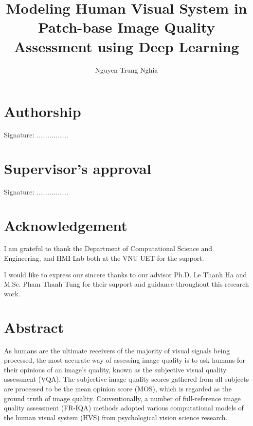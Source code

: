 \documentclass[a4paper, 13pt, oneside]{Thesis}
\title{Modeling Human Visual System in Patch-base Image Quality Assessment using Deep Learning}	%
\author{Nguyen Trung Nghia}			%
\begin{document}
%
\maketitle

%
\chapter*{Authorship}

\emph{
}

\bigskip
Signature: .................

%
\chapter*{Supervisor’s approval}
\emph{
}

\bigskip
Signature: .................


\chapter*{Acknowledgement}

I am grateful to thank the Department of Computational Science and Engineering, and HMI Lab both at the VNU UET for the support.

I would like to express our sincere thanks to our advisor Ph.D. Le Thanh Ha and M.Sc. Pham Thanh Tung for their support and guidance throughout this research work.
%
\chapter*{Abstract}

As humans are the ultimate receivers of the majority of visual signals being processed, the most accurate way of assessing image quality is to ask humans for their opinions of an image’s quality, known as the subjective visual quality assessment (VQA). The subjective image quality scores gathered from all subjects are processed to be the mean opinion score (MOS), which is regarded as the ground truth of image quality. Conventionally, a number of full-reference image quality assessment (FR-IQA) methods adopted various computational models of the human visual system (HVS) from psychological vision science research.
\end{document}
